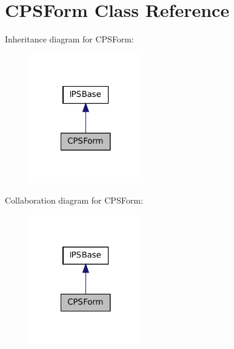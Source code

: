 \hypertarget{classCPSForm}{
\section{CPSForm Class Reference}
\label{classCPSForm}
}


Inheritance diagram for CPSForm:\nopagebreak
\begin{figure}[H]
\begin{center}
\leavevmode
\includegraphics[width=140pt]{classCPSForm__inherit__graph}
\end{center}
\end{figure}


Collaboration diagram for CPSForm:\nopagebreak
\begin{figure}[H]
\begin{center}
\leavevmode
\includegraphics[width=140pt]{classCPSForm__coll__graph}
\end{center}
\end{figure}
